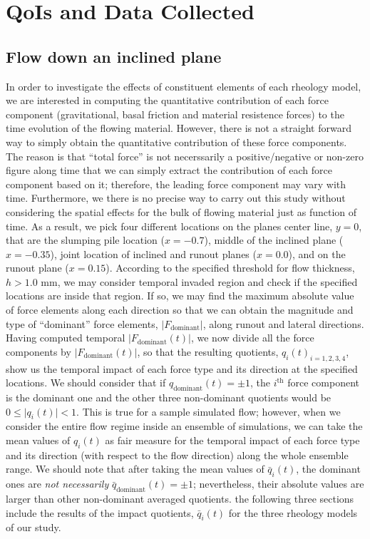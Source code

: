 \documentclass{article}
\begin{document}
\section{QoIs and Data Collected}
\subsection{Flow down an inclined plane}
In order to investigate the effects of constituent elements of each rheology model, we are interested in computing the quantitative contribution of each force component (gravitational, basal friction and material resistence forces) to the time evolution of the flowing material. However, there is not a straight forward way to simply obtain the quantitative contribution of these force components. The reason is that ``total force'' is not necerssarily a positive/negative or non-zero figure along time that we can simply extract the contribution of each force component based on it; therefore, the leading force component may vary with time. Furthermore, we there is no precise way to carry out this study without considering the spatial effects for the bulk of flowing material just as function of time. As a result, we pick four different locations on the planes center line, $y=0$, that are the slumping pile location ($x=-0.7$), middle of the inclined plane ($x=-0.35$), joint location of inclined and runout planes ($x=0.0$), and on the runout plane ($x=0.15$). According to the specified threshold for flow thickness, $h>1.0$ mm, we may consider temporal invaded region and check if the specified locations are inside that region. If so, we may find the maximum absolute value of force elements along each direction so that we can obtain the magnitude and type of ``dominant'' force elements, $\vert F_{\mathrm{dominant}}\vert$, along runout and lateral directions. Having computed temporal $\vert F_{\mathrm{dominant}}(t)\vert$, we now divide all the force components by $\vert F_{\mathrm{dominant}}(t)\vert$, so that the resulting quotients, $q_i(t)_{i=1,2,3,4}$, show us the temporal impact of each force type and its direction at the specified locations. We should consider that if $q_{\mathrm{dominant}}(t)=\pm 1$, the $i^\mathrm{{th}}$ force component is the dominant one and the other three non-dominant quotients would be $0 \leq \vert q_i(t) \vert < 1$. This is true for a sample simulated flow; however, when we consider the entire flow regime inside an ensemble of simulations, we can take the mean values of $q_i(t)$ as fair measure for the temporal impact of each force type and its direction (with respect to the flow direction) along the whole ensemble range. We should note that after taking the mean values of $\bar{q}_i(t)$, the dominant ones are \textit{not necessarily} $\bar{q}_{\mathrm{dominant}}(t)=\pm 1$; nevertheless, their absolute values are larger than other non-dominant averaged quotients. the following three sections include the results of the impact quotients, $\bar{q}_i(t)$ for the three rheology models of our study.
\end{document}
